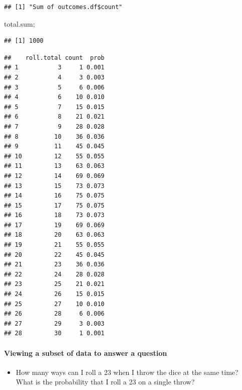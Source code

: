 \documentclass[
]{article}
\newenvironment{Shaded}{\begin{snugshade}}{\end{snugshade}}
\newcommand{\NormalTok}[1]{#1}
\newcommand{\OperatorTok}[1]{\textcolor[rgb]{0.81,0.36,0.00}{\textbf{#1}}}
\newcommand{\StringTok}[1]{\textcolor[rgb]{0.31,0.60,0.02}{#1}}
\providecommand{\tightlist}{%
  \setlength{\itemsep}{0pt}\setlength{\parskip}{0pt}}
\begin{document}
\begin{verbatim}
## [1] "Sum of outcomes.df$count"
\end{verbatim}

\begin{Shaded}
\begin{Highlighting}[]
\NormalTok{total.sum;}
\end{Highlighting}
\end{Shaded}

\begin{verbatim}
## [1] 1000
\end{verbatim}

\begin{Shaded}
\end{Shaded}

\begin{verbatim}
##    roll.total count  prob
## 1           3     1 0.001
## 2           4     3 0.003
## 3           5     6 0.006
## 4           6    10 0.010
## 5           7    15 0.015
## 6           8    21 0.021
## 7           9    28 0.028
## 8          10    36 0.036
## 9          11    45 0.045
## 10         12    55 0.055
## 11         13    63 0.063
## 12         14    69 0.069
## 13         15    73 0.073
## 14         16    75 0.075
## 15         17    75 0.075
## 16         18    73 0.073
## 17         19    69 0.069
## 18         20    63 0.063
## 19         21    55 0.055
## 20         22    45 0.045
## 21         23    36 0.036
## 22         24    28 0.028
## 23         25    21 0.021
## 24         26    15 0.015
## 25         27    10 0.010
## 26         28     6 0.006
## 27         29     3 0.003
## 28         30     1 0.001
\end{verbatim}

\hypertarget{viewing-a-subset-of-data-to-answer-a-question}{%
\paragraph{Viewing a subset of data to answer a
question}\label{viewing-a-subset-of-data-to-answer-a-question}}

\begin{itemize}
\tightlist
\item
  How many ways can I roll a 23 when I throw the dice at the same time?
  What is the probability that I roll a 23 on a single throw?
\end{itemize}
\end{document}
